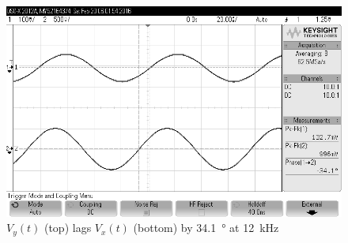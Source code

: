 \begin{figure}[tbph]
	\centering
	\includegraphics[width=0.7\linewidth]{graphics/12khz_phase_lag}
	\caption{$V_y(t)$ (top) lags $V_x(t)$ (bottom) by \SI{34.1}{\degree} at \SI{12}{\kilo\hertz}}
	\label{fig:scope}
\end{figure}

